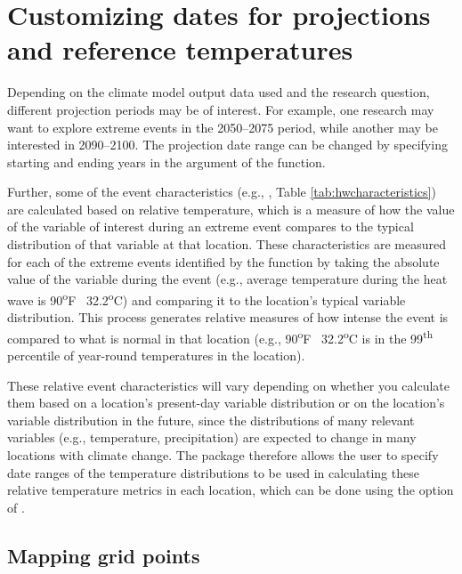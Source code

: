 \section{Customizing dates for projections and reference
temperatures}\label{customizing-dates-for-projections-and-reference-temperatures}

Depending on the climate model output data used and the research
question, different projection periods may be of interest. For example,
one research may want to explore extreme events in the 2050--2075
period, while another may be interested in 2090--2100. The projection
date range can be changed by specifying starting and ending years in the
 argument of the 
function.

Further, some of the event characteristics (e.g.,
, Table \ref{tab:hwcharacteristics}) are
calculated based on relative temperature, which is a measure of how the
value of the variable of interest during an extreme event compares to
the typical distribution of that variable at that location. These
characteristics are measured for each of the extreme events identified
by the  function by taking the absolute value of the
variable during the event (e.g., average temperature during the heat
wave is 90\textsuperscript{o}F ~32.2\textsuperscript{o}C) and comparing
it to the location's typical variable distribution. This process
generates relative measures of how intense the event is compared to what
is normal in that location (e.g., 90\textsuperscript{o}F
~32.2\textsuperscript{o}C is in the 99\textsuperscript{th} percentile of
year-round temperatures in the location).

These relative event characteristics will vary depending on whether you
calculate them based on a location's present-day variable distribution
or on the location's variable distribution in the future, since the
distributions of many relevant variables (e.g., temperature,
precipitation) are expected to change in many locations with climate
change. The package therefore allows the user to specify date ranges of
the temperature distributions to be used in calculating these relative
temperature metrics in each location, which can be done using the
 option of .

\subsection{Mapping grid points}\label{mapping-grid-points}

